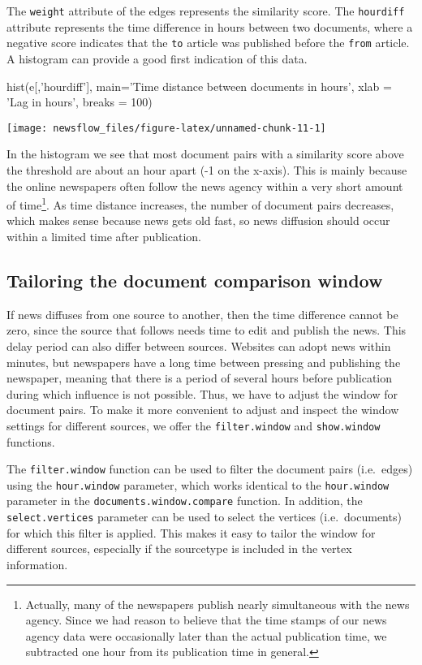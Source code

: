 The \texttt{weight} attribute of the edges represents the similarity
score. The \texttt{hourdiff} attribute represents the time difference in
hours between two documents, where a negative score indicates that the
\texttt{to} article was published before the \texttt{from} article. A
histogram can provide a good first indication of this data.

\begin{Schunk}
\begin{Sinput}
hist(e[,'hourdiff'], 
     main='Time distance between documents in hours', 
     xlab = 'Lag in hours', breaks = 100)
\end{Sinput}

\texttt{[image: newsflow\_files/figure-latex/unnamed-chunk-11-1]} \end{Schunk}

In the histogram we see that most document pairs with a similarity score
above the threshold are about an hour apart (-1 on the x-axis). This is
mainly because the online newspapers often follow the news agency within
a very short amount of time\footnote{Actually, many of the newspapers
  publish nearly simultaneous with the news agency. Since we had reason
  to believe that the time stamps of our news agency data were
  occasionally later than the actual publication time, we subtracted one
  hour from its publication time in general.}. As time distance
increases, the number of document pairs decreases, which makes sense
because news gets old fast, so news diffusion should occur within a
limited time after publication.

\subsection{Tailoring the document comparison window}

If news diffuses from one source to another, then the time difference
cannot be zero, since the source that follows needs time to edit and
publish the news. This delay period can also differ between sources.
Websites can adopt news within minutes, but newspapers have a long time
between pressing and publishing the newspaper, meaning that there is a
period of several hours before publication during which influence is not
possible. Thus, we have to adjust the window for document pairs. To make
it more convenient to adjust and inspect the window settings for
different sources, we offer the \texttt{filter.window} and
\texttt{show.window} functions.

The \texttt{filter.window} function can be used to filter the document
pairs (i.e.~edges) using the \texttt{hour.window} parameter, which works
identical to the \texttt{hour.window} parameter in the
\texttt{documents.window.compare} function. In addition, the
\texttt{select.vertices} parameter can be used to select the vertices
(i.e.~documents) for which this filter is applied. This makes it easy to
tailor the window for different sources, especially if the sourcetype is
included in the vertex information.

